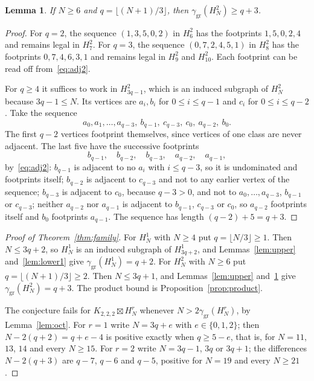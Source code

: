 \documentclass[11pt,a4paper,reqno]{amsart}
\newtheorem{lemma}[theorem]{Lemma}
\theoremstyle{definition}
\theoremstyle{remark}
\numberwithin{equation}{section}
\newcommand{\ggr}{\gamma_{\mathrm{gr}}}
\newcommand{\sprod}{\boxtimes}
\newcommand{\oct}{K_{2,2,2}}
\begin{document}
\begin{lemma}\label{lem:lower2}
If $N\ge6$ and $q=\lfloor(N+1)/3\rfloor$, then $\ggr(H^2_N)\ge q+3$.
\end{lemma}

\begin{proof}
For $q=2$, the sequence $(1,3,5,0,2)$ in $H^2_6$ has the footprints $1,5,0,2,4$ and remains legal in $H^2_7$. For $q=3$, the sequence $(0,7,2,4,5,1)$ in $H^2_8$ has the footprints $0,7,4,6,3,1$ and remains legal in $H^2_9$ and $H^2_{10}$. Each footprint can be read off from~\eqref{eq:adj2}.

For $q\ge4$ it suffices to work in $H^2_{3q-1}$, which is an induced subgraph of $H^2_N$ because $3q-1\le N$. Its vertices are $a_i,b_i$ for $0\le i\le q-1$ and $c_i$ for $0\le i\le q-2$. Take the sequence
\begin{equation}\label{eq:lower-sequence}
 a_0,a_1,\dots,a_{q-3},\ b_{q-1},\ c_{q-3},\ c_0,\ a_{q-2},\ b_0 .
\end{equation}
The first $q-2$ vertices footprint themselves, since vertices of one class are never adjacent. The last five have the successive footprints
\[
 b_{q-1},\quad b_{q-2},\quad b_{q-3},\quad a_{q-2},\quad a_{q-1},
\]
by~\eqref{eq:adj2}: $b_{q-1}$ is adjacent to no $a_i$ with $i\le q-3$, so it is undominated and footprints itself; $b_{q-2}$ is adjacent to $c_{q-3}$ and not to any earlier vertex of the sequence; $b_{q-3}$ is adjacent to $c_0$, because $q-3>0$, and not to $a_0,\dots,a_{q-3}$, $b_{q-1}$ or $c_{q-3}$; neither $a_{q-2}$ nor $a_{q-1}$ is adjacent to $b_{q-1}$, $c_{q-3}$ or $c_0$, so $a_{q-2}$ footprints itself and $b_0$ footprints $a_{q-1}$. The sequence has length $(q-2)+5=q+3$.
\end{proof}

\begin{proof}[Proof of Theorem~\ref{thm:family}]
For $H^1_N$ with $N\ge4$ put $q=\lfloor N/3\rfloor\ge1$. Then $N\le3q+2$, so $H^1_N$ is an induced subgraph of $H^1_{3q+2}$, and Lemmas~\ref{lem:upper} and~\ref{lem:lower1} give $\ggr(H^1_N)=q+2$. For $H^2_N$ with $N\ge6$ put $q=\lfloor(N+1)/3\rfloor\ge2$. Then $N\le3q+1$, and Lemmas~\ref{lem:upper} and~\ref{lem:lower2} give $\ggr(H^2_N)=q+3$. The product bound is Proposition~\ref{prop:product}.

The conjecture fails for $\oct\sprod H^r_N$ whenever $N>2\ggr(H^r_N)$, by Lemma~\ref{lem:oct}. For $r=1$ write $N=3q+e$ with $e\in\{0,1,2\}$; then $N-2(q+2)=q+e-4$ is positive exactly when $q\ge5-e$, that is, for $N=11$, $13$, $14$ and every $N\ge15$. For $r=2$ write $N=3q-1$, $3q$ or $3q+1$; the differences $N-2(q+3)$ are $q-7$, $q-6$ and $q-5$, positive for $N=19$ and every $N\ge21$.
\end{proof}
\end{document}
